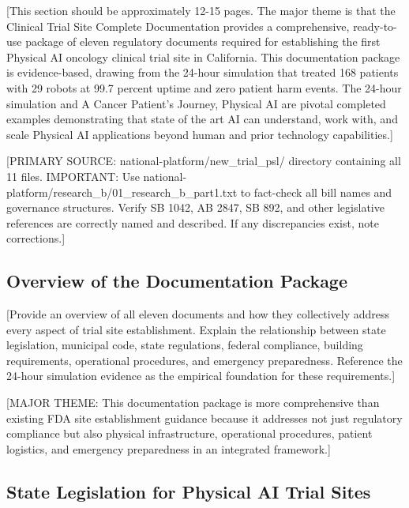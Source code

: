 
[This section should be approximately 12-15 pages. The major theme is that the
Clinical Trial Site Complete Documentation \cite{site-docs} provides a
comprehensive, ready-to-use package of eleven regulatory documents required for
establishing the first Physical AI oncology clinical trial site in California.
This documentation package is evidence-based, drawing from the 24-hour
simulation that treated 168 patients with 29 robots at 99.7 percent uptime and
zero patient harm events. The 24-hour simulation and A Cancer Patient's Journey,
Physical AI are pivotal completed examples demonstrating that state of the art
AI can understand, work with, and scale Physical AI applications beyond human
and prior technology capabilities.]

[PRIMARY SOURCE: national-platform/new\_trial\_psl/ directory containing all
11 files. IMPORTANT: Use national-platform/research\_b/01\_research\_b\_part1.txt
to fact-check all bill names and governance structures. Verify SB 1042,
AB 2847, SB 892, and other legislative references are correctly named and
described. If any discrepancies exist, note corrections.]

\subsection{Overview of the Documentation Package}
\label{subsec:site-overview}

[Provide an overview of all eleven documents and how they collectively address
every aspect of trial site establishment. Explain the relationship between
state legislation, municipal code, state regulations, federal compliance,
building requirements, operational procedures, and emergency preparedness.
Reference the 24-hour simulation evidence as the empirical foundation for
these requirements.]

[MAJOR THEME: This documentation package is more comprehensive than existing
FDA site establishment guidance because it addresses not just regulatory
compliance but also physical infrastructure, operational procedures, patient
logistics, and emergency preparedness in an integrated framework.]

\subsection{State Legislation for Physical AI Trial Sites}
\label{subsec:site-legislation}


